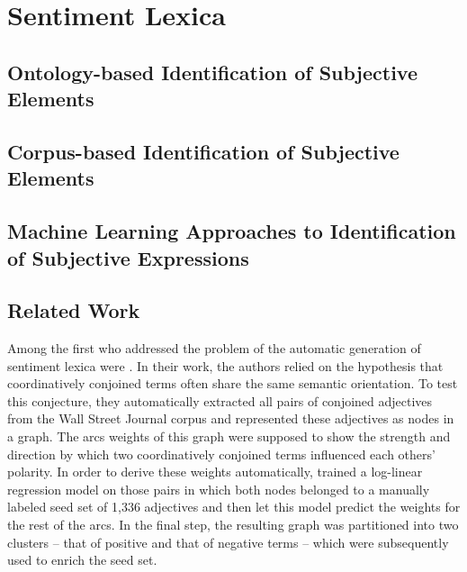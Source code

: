 

\section{Sentiment Lexica}
\subsection{Ontology-based Identification of Subjective Elements}
\subsection{Corpus-based Identification of Subjective Elements}
\subsection{Machine Learning Approaches to Identification of Subjective Expressions}

\subsection{Related Work}

Among the first who addressed the problem of the automatic generation
of sentiment lexica were \citet{Hatzivassi:97}.  In their work, the
authors relied on the hypothesis that coordinatively conjoined terms
often share the same semantic orientation.  To test this conjecture,
they automatically extracted all pairs of conjoined adjectives from
the Wall Street Journal corpus and represented these adjectives as
nodes in a graph.  The arcs weights of this graph were supposed to
show the strength and direction by which two coordinatively conjoined
terms influenced each others' polarity.  In order to derive these
weights automatically, \citeauthor{Hatzivassi:97} trained a log-linear
regression model on those pairs in which both nodes belonged to a
manually labeled seed set of 1,336 adjectives and then let this model
predict the weights for the rest of the arcs.  In the final step, the
resulting graph was partitioned into two clusters -- that of positive
and that of negative terms -- which were subsequently used to enrich
the seed set.

